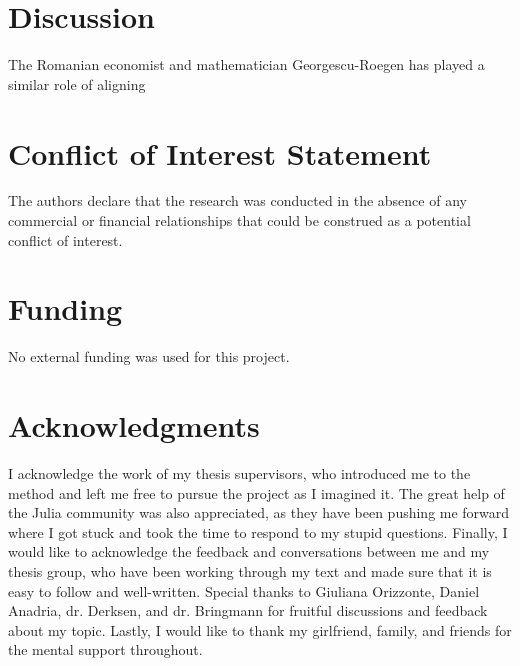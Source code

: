 \documentclass[utf8]{FrontiersinVancouver}
\begin{document}

\section{Discussion}

The Romanian economist and mathematician Georgescu-Roegen has played a similar role of aligning 


\section*{Conflict of Interest Statement}
The authors declare that the research was conducted in the absence of any commercial or financial relationships that could be construed as a potential conflict of interest.

\section*{Funding}
No external funding was used for this project.

\section*{Acknowledgments}
I acknowledge the work of my thesis supervisors, who introduced me to the method and left me free to pursue the project as I imagined it. The great help of the Julia community was also appreciated, as they have been pushing me forward where I got stuck and took the time to respond to my stupid questions. Finally, I would like to acknowledge the feedback and conversations between me and my thesis group, who have been working through my text and made sure that it is easy to follow and well-written. Special thanks to Giuliana Orizzonte, Daniel Anadria, dr. Derksen, and dr. Bringmann for fruitful discussions and feedback about my topic. Lastly, I would like to thank my girlfriend, family, and friends for the mental support throughout.
\end{document}
